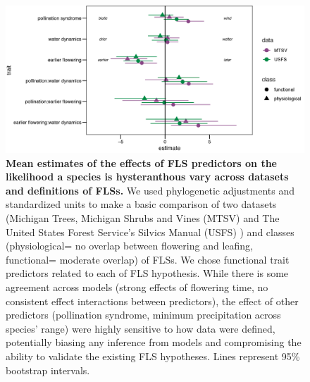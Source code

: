\documentclass[11pt]{article}
\begin{document}
\begin{figure}[H]
\centering
\includegraphics[width=\textwidth]{..//..//MTSV_USFS/MTSV_USFS.png} 
\caption{\textbf{Mean estimates of the effects of FLS predictors on the likelihood a species is hysteranthous vary across datasets and definitions of FLSs.}  We used phylogenetic adjustments and standardized units to make a basic comparison of two datasets (Michigan Trees, Michigan Shrubs and Vines (MTSV) \citep{Barnes2004,Barnes2016} and The United States Forest Service's Silvics Manual (USFS) \citep{Burns1990}) and classes (physiological= no overlap between flowering and leafing, functional= moderate overlap) of FLSs. We chose functional trait predictors related to each of FLS hypothesis. While there is some agreement across models (strong effects of flowering time, no consistent effect interactions between predictors), the effect of other predictors (pollination syndrome, minimum precipitation across species' range) were highly sensitive to how data were defined, potentially biasing any inference from models and compromising the ability to validate the existing FLS hypotheses. Lines represent 95\% bootstrap intervals.}
\label{fig:muplots.USMT}
\end{figure}
\end{document}
